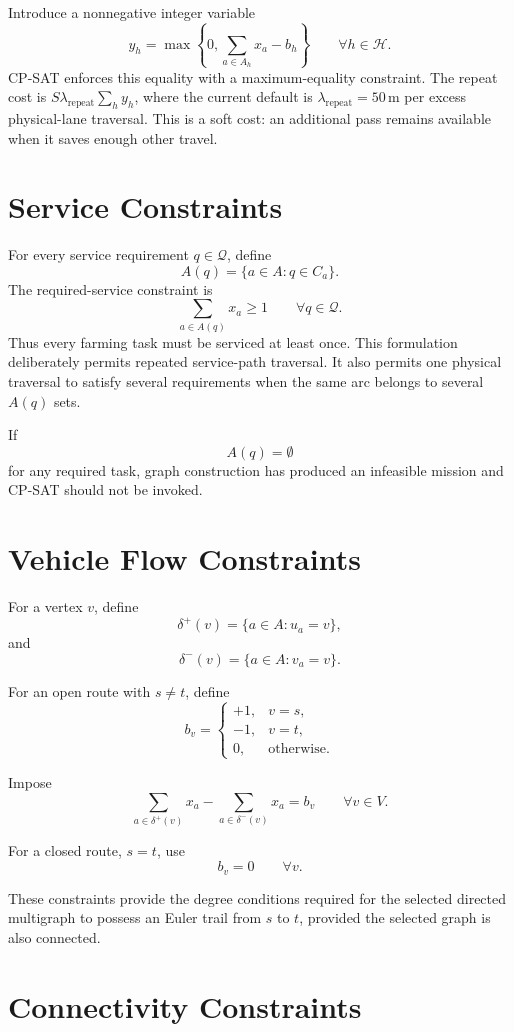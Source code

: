 \documentclass{article}
\begin{document}
Introduce a nonnegative integer variable
\[
y_h=\max\left\{0,\sum_{a\in A_h}x_a-b_h\right\}
\qquad\forall h\in\mathcal{H}.
\]
CP-SAT enforces this equality with a maximum-equality constraint. The repeat cost is $S\lambda_{\mathrm{repeat}}\sum_h y_h$, where the current default is $\lambda_{\mathrm{repeat}}=50\,$m per excess physical-lane traversal. This is a soft cost: an additional pass remains available when it saves enough other travel.

\section{Service Constraints}

For every service requirement $q\in\mathcal{Q}$, define
$$
A(q)
=
\{a\in A : q\in C_a\}.
$$
The required-service constraint is
$$
\sum_{a\in A(q)} x_a \geq 1
\qquad
\forall q\in\mathcal{Q}.
$$
Thus every farming task must be serviced at least once.
This formulation deliberately permits repeated service-path traversal.
It also permits one physical traversal to satisfy several requirements when the same arc belongs to several $A(q)$ sets.

If
$$
A(q)=\emptyset
$$
for any required task, graph construction has produced an infeasible mission and CP-SAT should not be invoked.

\section{Vehicle Flow Constraints}

For a vertex $v$, define
$$
\delta^+(v)
=
\{a\in A : u_a=v\},
$$
and
$$
\delta^-(v)
=
\{a\in A : v_a=v\}.
$$

For an open route with $s\neq t$, define
$$
b_v =
\begin{cases}
+1, & v=s,\\
-1, & v=t,\\
0,  & \text{otherwise}.
\end{cases}
$$

Impose
$$
\sum_{a\in\delta^+(v)}x_a
-
\sum_{a\in\delta^-(v)}x_a
=
b_v
\qquad
\forall v\in V.
$$

For a closed route, $s=t$, use
$$
b_v=0
\qquad
\forall v.
$$

These constraints provide the degree conditions required for the selected directed multigraph to possess an Euler trail from $s$ to $t$, provided the selected graph is also connected.

\section{Connectivity Constraints}
\end{document}
